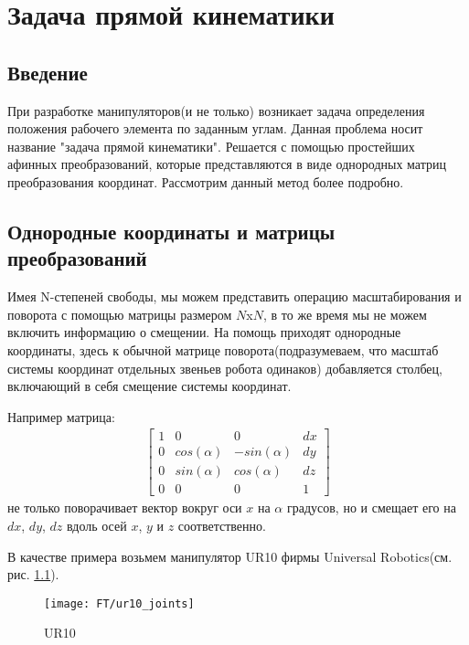 \chapter{Задача прямой кинематики} \label{ch:2}

\section{Введение} \label{sect2_1}
При разработке манипуляторов(и не только) возникает задача определения положения рабочего элемента по заданным углам. Данная проблема носит название "задача прямой кинематики". Решается с помощью простейших афинных преобразований, которые представляются в виде однородных матриц преобразования координат. Рассмотрим данный метод более подробно.

\section{Однородные координаты и матрицы преобразований}\label{sect2_2}
Имея N-степеней свободы, мы можем представить операцию масштабирования и поворота с помощью матрицы размером $N$x$N$, в то же время мы не можем включить информацию о смещении. На помощь приходят однородные координаты, здесь к обычной матрице поворота(подразумеваем, что масштаб системы координат отдельных звеньев робота одинаков) добавляется столбец, включающий в себя смещение системы координат.

Например матрица:
\begin{align*}
	\begin{bmatrix}
		1	&	0				&	0				&	dx\\
		0	&	cos(\alpha)		&	-sin(\alpha)	&	dy\\
		0	&	sin(\alpha)		&	cos(\alpha)		&	dz\\
		0	&	0				&	0				&	1
	\end{bmatrix}
\end{align*}
не только поворачивает вектор вокруг оси $x$ на $\alpha$ градусов, но и смещает его на $dx$, $dy$, $dz$ вдоль осей $x$, $y$ и $z$ соответственно.

В качестве примера возьмем манипулятор UR10 фирмы Universal Robotics(см. рис. \ref{fig:ft_sheme1}). 
\begin{figure}[ht]
	\centering
	\texttt{[image: FT/ur10\_joints]}
	\caption{UR10}
	\label{fig:ft_sheme1}
\end{figure}

